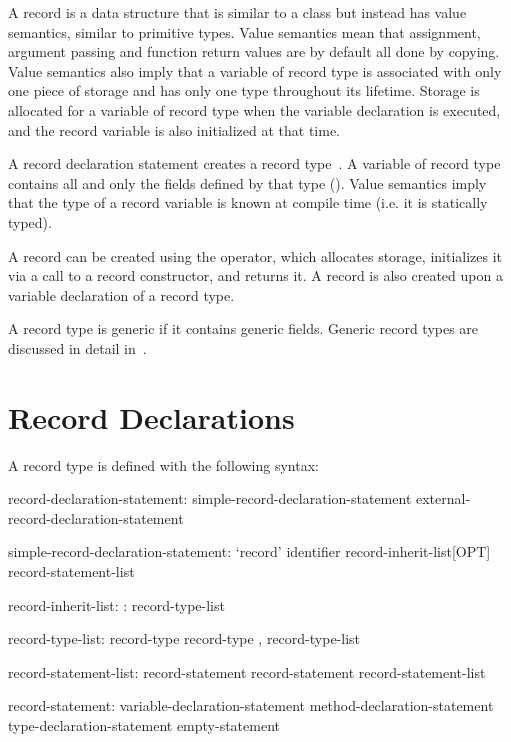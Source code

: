 \label{Records}

A record is a data structure that is similar to a class but instead has value
semantics, similar to primitive types.  Value semantics mean that assignment, argument passing and function
return values are by default all done by copying.  Value semantics also imply that a
variable of record type is associated with only one piece of storage and has
only one type throughout its lifetime.  Storage is allocated for a variable of
record type when the variable declaration is executed, and the record variable
is also initialized at that time.

A record declaration statement creates a record type~.  A
variable of record type contains all and only the fields defined by that type
().  Value semantics imply that the type of a record variable
is known at compile time (i.e. it is statically typed).  

A record can be created using the  operator, which
allocates storage, initializes it via a call to a record constructor,
and returns it.
A record is also created upon a variable declaration of a record type.

A record type is generic if it contains generic fields.  Generic record types
are discussed in detail in~.

\section{Record Declarations}
\label{Record_Declarations}

A record type is defined with the following syntax:
\begin{syntax}
record-declaration-statement:
  simple-record-declaration-statement
  external-record-declaration-statement

simple-record-declaration-statement:
  `record' identifier record-inherit-list[OPT] { record-statement-list }

record-inherit-list:
  : record-type-list

record-type-list:
  record-type
  record-type , record-type-list

record-statement-list:
  record-statement
  record-statement record-statement-list

record-statement:
  variable-declaration-statement
  method-declaration-statement
  type-declaration-statement
  empty-statement
\end{syntax}

